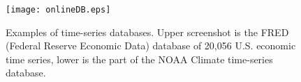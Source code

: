 \begin{figure}[tbp]
   \centering
   \texttt{[image: onlineDB.eps]}
   \caption{Examples of time-series databases. Upper screenshot is the FRED (Federal Reserve Economic Data) database of 20,056 U.S. economic time series, lower is the part of the NOAA Climate time-series database.}
   \label{fig:onlineDB}
\end{figure} 
